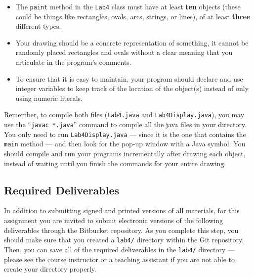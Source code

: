 \begin{itemize}

  \item The {\tt paint} method in the {\tt Lab4} class must have at least \textbf{ten} objects (these could be things
    like rectangles, ovals, arcs, strings, or lines), of at least \textbf{three} different types.

  \item Your drawing should be a concrete representation of something, it cannot be randomly placed rectangles and ovals
    without a clear meaning that you articulate in the program's comments.

  \item To ensure that it is easy to maintain, your program should declare and use integer variables to keep track of
    the location of the object(s) instead of only using numeric literals.

\end{itemize}

\begin{sloppypar}
Remember, to compile both files ({\tt Lab4.java} and {\tt Lab4Display.java}), you may use the ``{\tt javac *.java}''
command to compile all the {\.java} files in your directory. You only need to run {\tt Lab4Display.java} --- since it is
the one that contains the {\tt main} method --- and then look for the pop-up window with a Java symbol. You should
compile and run your programs incrementally after drawing each object, instead of waiting until you finish the commands
for your entire drawing.
\end{sloppypar}

\vspace*{-.1in}
\subsection*{Required Deliverables}

In addition to submitting signed and printed versions of all materials, for this assignment you are invited to submit
electronic versions of the following deliverables through the Bitbucket repository. As you complete this step, you
should make sure that you created a {\tt lab4/} directory within the Git repository.  Then, you can save all of the
required deliverables in the {\tt lab4/} directory --- please see the course instructor or a teaching assistant if you are
not able to create your directory properly.

